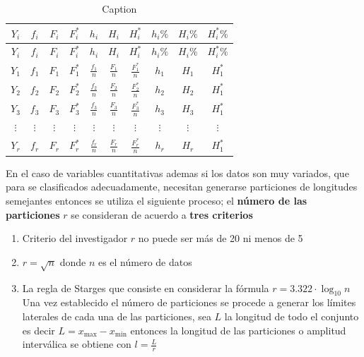 \documentclass[
  10pt,
]{krantz}
\theoremstyle{definition}
\theoremstyle{definition}
\theoremstyle{definition}
\theoremstyle{definition}
\theoremstyle{remark}
\begin{document}
\begin{longtable}[]{@{}cccccccccc@{}}
\caption{\label{tab:ww} Caption}\tabularnewline
\toprule
\(Y_i\) & \(f_i\) & \(F_i\) & \(F_i^*\) & \(h_i\) & \(H_i\) & \(H_i^*\) & \(h_i\%\) & \(H_i\%\) & \(H_i^*\%\) \\
\midrule
\endfirsthead
\toprule
\(Y_i\) & \(f_i\) & \(F_i\) & \(F_i^*\) & \(h_i\) & \(H_i\) & \(H_i^*\) & \(h_i\%\) & \(H_i\%\) & \(H_i^*\%\) \\
\midrule
\endhead
\(Y_1\) & \(f_1\) & \(F_1\) & \(F_1^*\) & \(\frac{f_1}{n}\) & \(\frac{F_1}{n}\) & \(\frac{F_1^*}{n}\) & \(h_1\) & \(H_1\) & \(H_1^*\) \\
\(Y_2\) & \(f_2\) & \(F_2\) & \(F_2^*\) & \(\frac{f_2}{n}\) & \(\frac{F_2}{n}\) & \(\frac{F_2^*}{n}\) & \(h_2\) & \(H_2\) & \(H_1^*\) \\
\(Y_3\) & \(f_3\) & \(F_3\) & \(F_3^*\) & \(\frac{f_3}{n}\) & \(\frac{F_3}{n}\) & \(\frac{F_3^*}{n}\) & \(h_3\) & \(H_3\) & \(H_1^*\) \\
\(\vdots\) & \(\vdots\) & \(\vdots\) & \(\vdots\) & \(\vdots\) & \(\vdots\) & \(\vdots\) & \(\vdots\) & \(\vdots\) & \(\vdots\) \\
\(Y_r\) & \(f_r\) & \(F_r\) & \(F_r^*\) & \(\frac{f_r}{n}\) & \(\frac{F_r}{n}\) & \(\frac{F_r^*}{n}\) & \(h_r\) & \(H_r\) & \(H_1^*\) \\
\bottomrule
\end{longtable}

En el caso de variables cuantitativas ademas si los datos son muy variados, que para se clasificados adecuadamente, necesitan generarse particiones de longitudes semejantes entonces se utiliza el siguiente proceso; el \textbf{número de las particiones} \(r\) se consideran de acuerdo a \textbf{tres criterios}

\begin{enumerate}
\def\labelenumi{\arabic{enumi}.}
\item
  Criterio del investigador \(r\) no puede ser más de 20 ni menos de 5
\item
  \(r=\sqrt{n}\) donde \(n\) es el número de datos
\item
  La regla de Starges que consiste en considerar la fórmula \(r=3.322\cdot\log_{10} n\)
  Una vez establecido el número de particiones se procede a generar los límites laterales de cada una de las particiones, sea \(L\) la longitud de todo el conjunto es decir \(L=x_{\text{max}}-x_{\text{min}}\) entonces la longitud de las particiones o amplitud interválica se obtiene con \(l=\frac{L}{r}\)
\end{enumerate}
\end{document}
